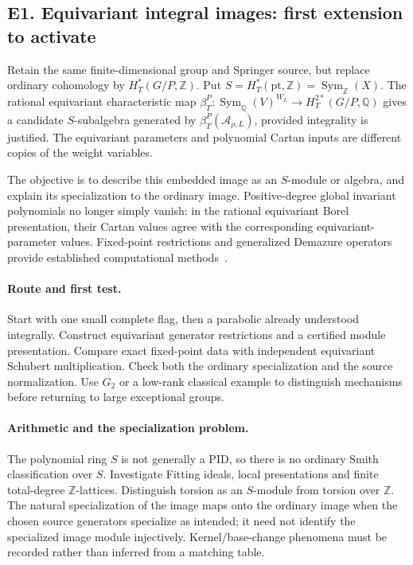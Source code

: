 \documentclass[11pt,letterpaper]{article}
\newcommand{\Z}{\mathbb Z}
\newcommand{\Q}{\mathbb Q}
\newcommand{\Sym}{\operatorname{Sym}}
\begin{document}
\subsection*{E1. Equivariant integral images: first extension to activate}
Retain the same finite-dimensional group and Springer source, but replace
ordinary cohomology by \(H_T^*(G/P,\Z)\). Put
\(S=H_T^*(\mathrm{pt},\Z)=\Sym_\Z(X)\).
The rational equivariant characteristic map
\(\beta_T^P:\Sym_\Q(V)^{W_L}\to H_T^{2*}(G/P,\Q)\)
gives a candidate \(S\)-subalgebra generated by
\(\beta_T^P(\mathcal A_{\rho,L})\), provided integrality is justified.
The equivariant parameters and polynomial Cartan inputs are different
copies of the weight variables.

The objective is to describe this embedded image as an \(S\)-module or
algebra, and explain its specialization to the ordinary image.
Positive-degree global invariant polynomials no longer simply vanish:
in the rational equivariant Borel presentation, their Cartan values agree
with the corresponding equivariant-parameter values.
Fixed-point restrictions and generalized Demazure operators provide
established computational methods~\cite{CZZ}.

\paragraph{Route and first test.}
Start with one small complete flag, then a parabolic already understood
integrally. Construct equivariant generator restrictions and a certified
module presentation. Compare exact fixed-point data with independent
equivariant Schubert multiplication. Check both the ordinary
specialization and the source normalization. Use \(G_2\) or a low-rank
classical example to distinguish mechanisms before returning to large
exceptional groups.

\paragraph{Arithmetic and the specialization problem.}
The polynomial ring \(S\) is not generally a PID, so there is no ordinary
Smith classification over \(S\). Investigate Fitting ideals, local
presentations and finite total-degree \(\Z\)-lattices. Distinguish torsion
as an \(S\)-module from torsion over \(\Z\).
The natural specialization of the image maps onto the ordinary image
when the chosen source generators specialize as intended; it need not
identify the specialized image module injectively. Kernel/base-change
phenomena must be recorded rather than inferred from a matching table.
\end{document}
